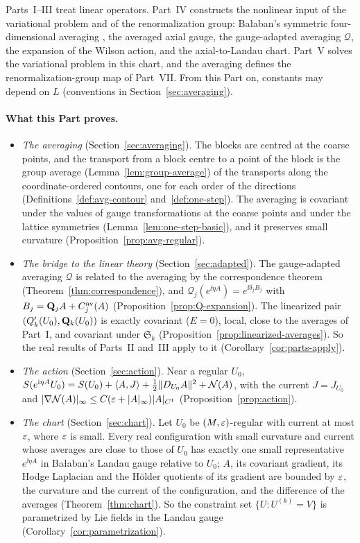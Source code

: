 \label{intro:IV}
Parts~I--III treat linear operators. Part~IV constructs the nonlinear input of the variational problem and of the renormalization group: Ba\l aban's symmetric four-dimensional averaging \cite[(0.3)--(0.12)]{BalYM4I}, the averaged axial gauge, the gauge-adapted averaging $\mathcal Q$, the expansion of the Wilson action, and the axial-to-Landau chart. Part~V solves the variational problem in this chart, and the averaging defines the renormalization-group map of Part~VII. From this Part on, constants may depend on $L$ (conventions in Section~\ref{sec:averaging}).

\paragraph{What this Part proves.}
\begin{itemize}
\item \emph{The averaging} (Section~\ref{sec:averaging}). The blocks are centred at the coarse points, and the transport from a block centre to a point of the block is the group average (Lemma~\ref{lem:group-average}) of the transports along the coordinate-ordered contours, one for each order of the directions (Definitions~\ref{def:avg-contour} and~\ref{def:one-step}). The averaging is covariant under the values of gauge transformations at the coarse points and under the lattice symmetries (Lemma~\ref{lem:one-step-basic}), and it preserves small curvature (Proposition~\ref{prop:avg-regular}).
\item \emph{The bridge to the linear theory} (Section~\ref{sec:adapted}). The gauge-adapted averaging $\mathcal Q$ is related to the averaging by the correspondence theorem (Theorem~\ref{thm:correspondence}), and $\mathcal Q_j(e^{\ii\eta A})=e^{\ii\delta_jB_j}$ with $B_j=\mathbf Q_jA+C^{\rm av}_j(A)$ (Proposition~\ref{prop:Q-expansion}). The linearized pair $(Q'_k(U_0),\mathbf Q_k(U_0))$ is exactly covariant ($E=0$), local, close to the averages of Part~I, and covariant under $\mathfrak S_k$ (Proposition~\ref{prop:linearized-averages}). So the real results of Parts~II and~III apply to it (Corollary~\ref{cor:parts-apply}).
\item \emph{The action} (Section~\ref{sec:action}). Near a regular $U_0$, $S(e^{\mathrm i\eta A}U_0)=S(U_0)+\langle A,J\rangle+\frac12\|D_{U_0}A\|^2+\mathcal N(A)$, with the current $J=J_{U_0}$ and $|\nabla\mathcal N(A)|_\infty\le C(\varepsilon+|A|_\infty)|A|_{C^1}$ (Proposition~\ref{prop:action}).
\item \emph{The chart} (Section~\ref{sec:chart}). Let $U_0$ be $(M,\varepsilon)$-regular with current at most $\varepsilon$, where $\varepsilon$ is small. Every real configuration with small curvature and current whose averages are close to those of $U_0$ has exactly one small representative $e^{\ii\eta A}$ in Ba\l aban's Landau gauge relative to $U_0$; $A$, its covariant gradient, its Hodge Laplacian and the H\"older quotients of its gradient are bounded by $\varepsilon$, the curvature and the current of the configuration, and the difference of the averages (Theorem~\ref{thm:chart}). So the constraint set $\{U:U^{(k)}=V\}$ is parametrized by Lie fields in the Landau gauge (Corollary~\ref{cor:parametrization}).
\end{itemize}
